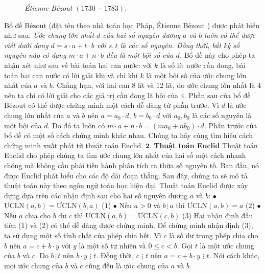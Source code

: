 \begin{multicols}{2}
\begin{figure}[H]
		\caption{\small\textit{\color{hoccungpi}Étienne Bézout $(1730 - 1783)$.}}
		\vspace*{-10pt}
	\end{figure}
	Bổ đề Bézout (đặt tên theo nhà toán học Pháp, Étienne Bézout ) được phát biểu như sau:
	\vskip 0.1cm
	\textit{Ước chung lớn nhất $d$ của hai số nguyên dương $a$ và $b$ luôn có thể được viết dưới dạng $d=s\cdot a+t\cdot b$ với $s,t$ là các số nguyên. Đồng thời, bất kỳ số nguyên nào có dạng $m\cdot a+n\cdot b$ đều là một bội số của $d$.}
	\vskip 0.1cm
	Bổ đề này cho phép ta nhận xét như sau về bài toán hai can nước: với $k$ là số lít nước cần đong, bài toán hai can nước có lời giải khi và chỉ khi $k$ là một bội số của ước chung lớn nhất của $a$ và $b$. Chẳng hạn, với hai can $8$ lít và $12$ lít, do ước chung lớn nhất là $4$ nên ta chỉ có lời giải cho các giá trị cần đong là bội của $4$.
	\vskip 0.1cm 
	Phần sau của bổ đề Bézout có thể được chứng minh một cách dễ dàng từ phần trước. Vì $d$ là ước chung lớn nhất của $a$ và $b$ nên $a=a_0\cdot d$, $b=b_0\cdot d$ với $a_0, b_0$ là các số nguyên là một bội của $d$. Do đó ta luôn có $m\cdot a+n\cdot b=(ma_0+nb_0)\cdot d$.
	\vskip 0.1cm
	Phần trước của bổ đề có một số cách chứng minh khác nhau. Chúng ta hãy cùng tìm hiểu cách chứng minh xuất phát từ thuật toán Euclid. 
	\vskip 0.1cm
	$\pmb{2.}$ \textbf{\color{hoccungpi}Thuật toán Euclid}
	\vskip 0.1cm
	Thuật toán Euclid cho phép chúng ta tìm ước chung lớn nhất của hai số một cách nhanh chóng mà không cần phải tiến hành phân tích ra thừa số nguyên tố. Ban đầu, nó được Euclid phát biểu cho các độ dài đoạn thẳng. Sau đây, chúng ta sẽ mô tả thuật toán này theo ngôn ngữ toán học hiện đại.
	\vskip 0.1cm
	Thuật toán Euclid được xây dựng dựa trên các nhận định sau cho hai số nguyên dương $a$ và $b$:
	\vskip 0.1cm
	$\bullet$ $\text{ƯCLN}(a,b) = \text{ƯCLN}(b,a)$					\hfill ($1$)
	\vskip 0.1cm
	$\bullet$ Nếu $a>0$ và $b \,\vdots \,a$ thì $\text{ƯCLN}(a,b) = a$			\hfill ($2$)
	\vskip 0.1cm
	$\bullet$ Nếu $a$ chia cho $b$ dư $c$ thì $\text{ƯCLN}(a,b) = \text{ƯCLN}(c,b)$		\hfill ($3$)
	\vskip 0.1cm
	Hai nhận định đầu tiên ($1$) và ($2$) có thể dễ dàng được chứng minh. Để chứng minh nhận định ($3$), ta sử dụng một số tính chất của phép chia hết. 
	\vskip 0.1cm
	Vì $c$ là số dư trong phép chia cho $b$ nên $a=c+b\cdot y$ với $y$ là một số tự nhiên và $0 \le c < b$. Gọi $t$ là một ước chung của $b$ và $c$. Do $b\,\vdots\, t$ nên $b\cdot y\,\, \vdots\,\,t$. Đồng thời, $c\,\,\vdots\,\,t$ nên $a=c+b\cdot y\,\,\vdots\,\,t$. Nói cách khác, mọi ước chung của $b$ và $c$ cũng đều là ước chung của $a$ và $b$. 

\end{multicols}
